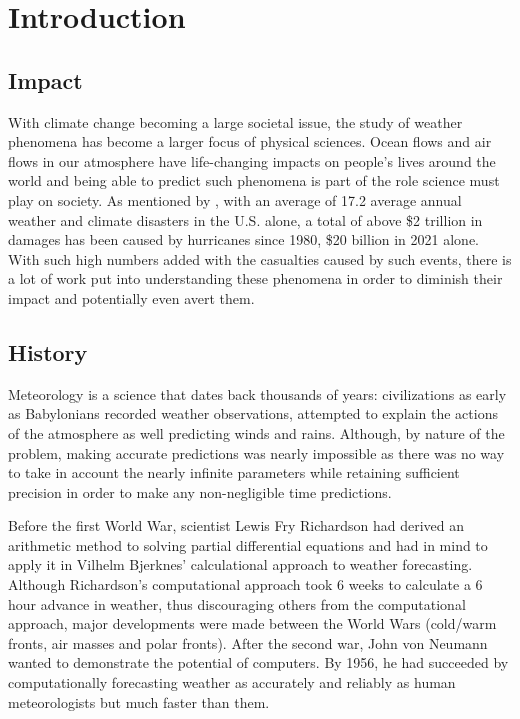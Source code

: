 \chapter{Introduction}
\section{Impact}
With climate change becoming a large societal issue, the study of weather phenomena has become a larger focus of physical sciences. Ocean flows and air flows in our atmosphere have life-changing impacts on people's lives around the world and being able to predict such phenomena is part of the role science must play on society. As mentioned by \cite{noaa}, with an average of 17.2 average annual weather and climate disasters in the U.S. alone, a total of above \$2 trillion in damages has been caused by hurricanes since 1980, \$20 billion in 2021 alone. With such high numbers added with the casualties caused by such events, there is a lot of work put into understanding these phenomena in order to diminish their impact and potentially even avert them.
\section{History}
Meteorology is a science that dates back thousands of years: civilizations as early as Babylonians recorded weather observations, attempted to explain the actions of the atmosphere as well predicting winds and rains. Although, by nature of the problem, making accurate predictions was nearly impossible as there was no way to take in account the nearly infinite parameters while retaining sufficient precision in order to make any non-negligible time predictions. \cite{nebeker1995calculating}

Before the first World War, scientist Lewis Fry Richardson had derived an arithmetic method to solving partial differential equations and had in mind to apply it in Vilhelm Bjerknes' calculational approach to weather forecasting. Although Richardson's computational approach took 6 weeks to calculate a 6 hour advance in weather, thus discouraging others from the computational approach, major developments were made between the World Wars (cold/warm fronts, air masses and polar fronts). After the second war, John von Neumann wanted to demonstrate the potential of computers. By 1956, he had succeeded by computationally forecasting weather as accurately and reliably as human meteorologists but much faster than them. \cite{nebeker1995calculating}

